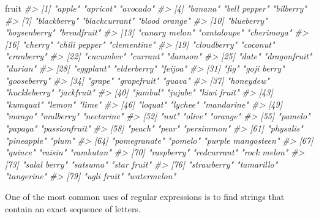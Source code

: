 \documentclass[]{book}
\newenvironment{Shaded}{\begin{snugshade}}{\end{snugshade}}
\newcommand{\CommentTok}[1]{\textcolor[rgb]{0.56,0.35,0.01}{\textit{#1}}}
\newcommand{\NormalTok}[1]{#1}
\begin{document}
\begin{Shaded}
\begin{Highlighting}[]
\NormalTok{fruit}
\CommentTok{#>  [1] "apple"             "apricot"           "avocado"          }
\CommentTok{#>  [4] "banana"            "bell pepper"       "bilberry"         }
\CommentTok{#>  [7] "blackberry"        "blackcurrant"      "blood orange"     }
\CommentTok{#> [10] "blueberry"         "boysenberry"       "breadfruit"       }
\CommentTok{#> [13] "canary melon"      "cantaloupe"        "cherimoya"        }
\CommentTok{#> [16] "cherry"            "chili pepper"      "clementine"       }
\CommentTok{#> [19] "cloudberry"        "coconut"           "cranberry"        }
\CommentTok{#> [22] "cucumber"          "currant"           "damson"           }
\CommentTok{#> [25] "date"              "dragonfruit"       "durian"           }
\CommentTok{#> [28] "eggplant"          "elderberry"        "feijoa"           }
\CommentTok{#> [31] "fig"               "goji berry"        "gooseberry"       }
\CommentTok{#> [34] "grape"             "grapefruit"        "guava"            }
\CommentTok{#> [37] "honeydew"          "huckleberry"       "jackfruit"        }
\CommentTok{#> [40] "jambul"            "jujube"            "kiwi fruit"       }
\CommentTok{#> [43] "kumquat"           "lemon"             "lime"             }
\CommentTok{#> [46] "loquat"            "lychee"            "mandarine"        }
\CommentTok{#> [49] "mango"             "mulberry"          "nectarine"        }
\CommentTok{#> [52] "nut"               "olive"             "orange"           }
\CommentTok{#> [55] "pamelo"            "papaya"            "passionfruit"     }
\CommentTok{#> [58] "peach"             "pear"              "persimmon"        }
\CommentTok{#> [61] "physalis"          "pineapple"         "plum"             }
\CommentTok{#> [64] "pomegranate"       "pomelo"            "purple mangosteen"}
\CommentTok{#> [67] "quince"            "raisin"            "rambutan"         }
\CommentTok{#> [70] "raspberry"         "redcurrant"        "rock melon"       }
\CommentTok{#> [73] "salal berry"       "satsuma"           "star fruit"       }
\CommentTok{#> [76] "strawberry"        "tamarillo"         "tangerine"        }
\CommentTok{#> [79] "ugli fruit"        "watermelon"}
\end{Highlighting}
\end{Shaded}

One of the most common uses of regular expressions is to find strings
that contain an exact sequence of letters.
\end{document}
